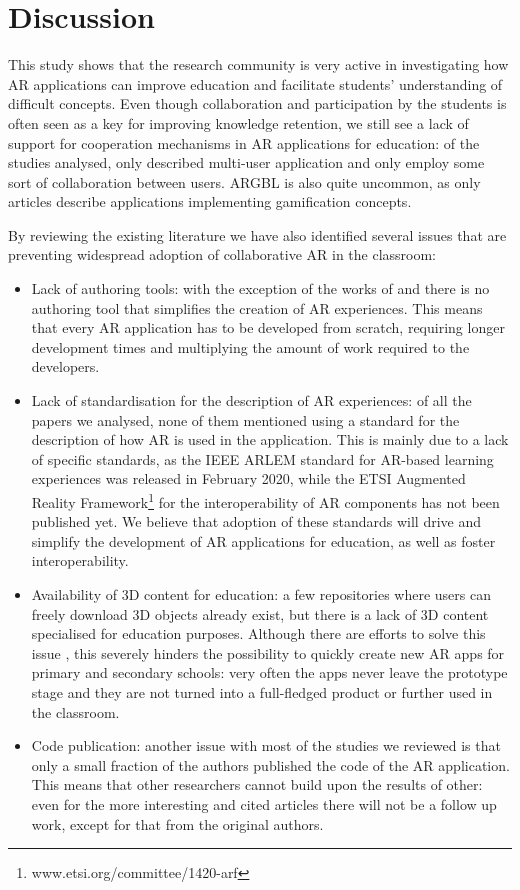 \section{Discussion} \label{sec:discussion}

This study shows that the research community is very active in investigating how \gls{AR} applications can improve education and facilitate students' understanding of difficult concepts.
Even though collaboration and participation by the students is often seen as a key for improving knowledge retention, we still see a lack of support for cooperation mechanisms in AR applications for education: of the \papersSelected studies analysed, only \papersMultiuser described multi-user application and only \papersCollab employ some sort of collaboration between users. \gls{ARGBL} is also quite uncommon, as only \papersGames articles describe applications implementing gamification concepts. 

By reviewing the existing literature we have also identified several issues that are preventing widespread adoption of collaborative \gls{AR} in the classroom:
\begin{itemize}
    \item Lack of authoring tools: with the exception of the works of \citet{lytridis2018artutor} and \citet{whitlock2020mrcat} there is no authoring tool that simplifies the creation of AR experiences. This means that every AR application has to be developed from scratch, requiring longer development times and multiplying the amount of work required to the developers.
    \item Lack of standardisation for the description of AR experiences: of all the papers we analysed, none of them mentioned using a standard for the description of how AR is used in the application. This is mainly due to a lack of specific standards, as the IEEE ARLEM standard \citep{arlem2020} for AR-based learning experiences was released in February 2020, while the ETSI Augmented Reality Framework\footnote{www.etsi.org/committee/1420-arf} for the interoperability of AR components has not been published yet. We believe that adoption of these standards will drive and simplify the development of \gls{AR} applications for education, as well as foster interoperability.
    \item Availability of 3D content for education: a few repositories where users can freely download 3D objects already exist, but there is a lack of 3D content specialised for education purposes. Although there are efforts to solve this issue \citep{masneri2020work}, this severely hinders the possibility to quickly create new AR apps for primary and secondary schools: very often the apps never leave the prototype stage and they are not turned into a full-fledged product or further used in the classroom.
    \item Code publication: another issue with most of the studies we reviewed is that only a small fraction of the authors published the code of the \gls{AR} application. This means that other researchers cannot build upon the results of other: even for the more interesting and cited articles there will not be a follow up work, except for that from the original authors.
\end{itemize}

